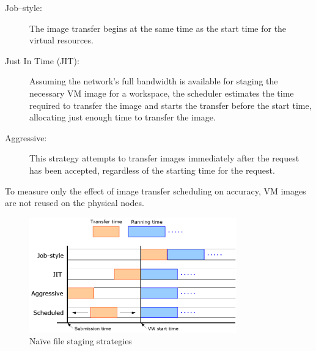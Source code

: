 \begin{description}
\item[Job--style:] The image transfer begins at the same time as the start time for the virtual resources.
\item[Just In Time (JIT):] Assuming the network's full bandwidth is available for staging the necessary VM image for a workspace, the scheduler estimates the time required to transfer the image and starts the transfer before the start time, allocating just enough time to transfer the image.
\item[Aggressive:] This strategy attempts to transfer images immediately after the request has been accepted, regardless of the
starting time for the request.
\end{description}

To measure only the effect of image transfer scheduling on accuracy, VM images are not reused on the physical nodes.

\begin{figure}
  \begin{center}
    \includegraphics[width=0.8\textwidth]{figures/filetransfer.png}
    \caption{Naïve file staging strategies}
	\label{fig:filetransfer}
  \end{center}
\end{figure}



